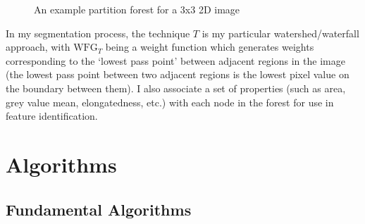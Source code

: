 \begin{figure}[p]
\begin{center}
	\hspace{4mm}%
	\hspace{4mm}%
\end{center}
\caption{An example partition forest for a 3x3 2D image}
\label{fig:ipfs-example}
\end{figure}

In my segmentation process, the technique $T$ is my particular watershed/waterfall approach, with $\mbox{WFG}_T$ being a weight function which generates weights corresponding to the `lowest pass point' between adjacent regions in the image (the lowest pass point between two adjacent regions is the lowest pixel value on the boundary between them). I also associate a set of properties (such as area, grey value mean, elongatedness, etc.) with each node in the forest for use in feature identification.

\section{Algorithms}

\subsection{Fundamental Algorithms}

